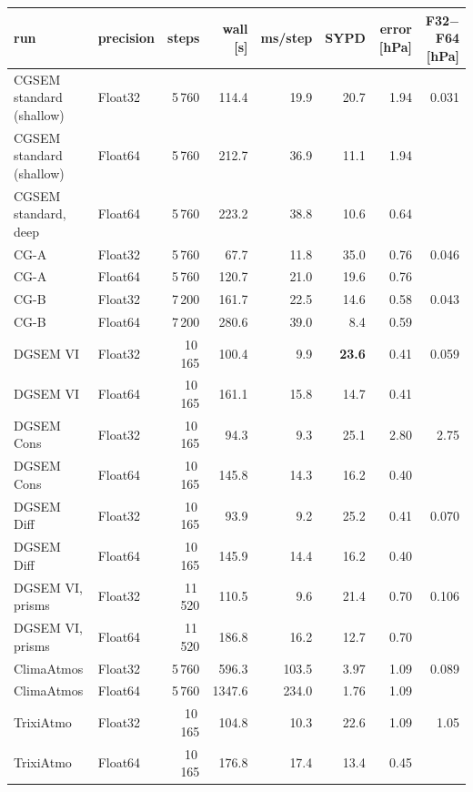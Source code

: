 \documentclass[11pt,a4paper]{article}
\begin{document}
\begin{center}
\footnotesize\setlength{\tabcolsep}{4pt}
\begin{tabular}{llrrrrrr}
\toprule
run & precision & steps & wall [s] & ms/step & SYPD & error [hPa] & F32$-$F64 [hPa] \\
\midrule
CGSEM standard (shallow) & Float32 & 5\,760 & 114.4 & 19.9 & 20.7 & 1.94 & 0.031 \\
CGSEM standard (shallow) & Float64 & 5\,760 & 212.7 & 36.9 & 11.1 & 1.94 & \\
CGSEM standard, deep     & Float64 & 5\,760 & 223.2 & 38.8 & 10.6 & 0.64 & \\
CG-A                     & Float32 & 5\,760 & 67.7  & 11.8 & 35.0 & 0.76 & 0.046 \\
CG-A                     & Float64 & 5\,760 & 120.7 & 21.0 & 19.6 & 0.76 & \\
CG-B                     & Float32 & 7\,200 & 161.7 & 22.5 & 14.6 & 0.58 & 0.043 \\
CG-B                     & Float64 & 7\,200 & 280.6 & 39.0 & 8.4  & 0.59 & \\
\midrule
DGSEM VI                 & Float32 & 10\,165 & 100.4 & 9.9  & \textbf{23.6} & 0.41 & 0.059 \\
DGSEM VI                 & Float64 & 10\,165 & 161.1 & 15.8 & 14.7 & 0.41 & \\
DGSEM Cons               & Float32 & 10\,165 & 94.3  & 9.3  & 25.1 & 2.80 & 2.75 \\
DGSEM Cons               & Float64 & 10\,165 & 145.8 & 14.3 & 16.2 & 0.40 & \\
DGSEM Diff               & Float32 & 10\,165 & 93.9  & 9.2  & 25.2 & 0.41 & 0.070 \\
DGSEM Diff               & Float64 & 10\,165 & 145.9 & 14.4 & 16.2 & 0.40 & \\
DGSEM VI, prisms         & Float32 & 11\,520 & 110.5 & 9.6  & 21.4 & 0.70 & 0.106 \\
DGSEM VI, prisms         & Float64 & 11\,520 & 186.8 & 16.2 & 12.7 & 0.70 & \\
\midrule
ClimaAtmos               & Float32 & 5\,760 & 596.3  & 103.5 & 3.97 & 1.09 & 0.089 \\
ClimaAtmos               & Float64 & 5\,760 & 1347.6 & 234.0 & 1.76 & 1.09 & \\
TrixiAtmo                & Float32 & 10\,165 & 104.8 & 10.3 & 22.6 & 1.09 & 1.05 \\
TrixiAtmo                & Float64 & 10\,165 & 176.8 & 17.4 & 13.4 & 0.45 & \\
\bottomrule
\end{tabular}
\end{center}
\end{document}
